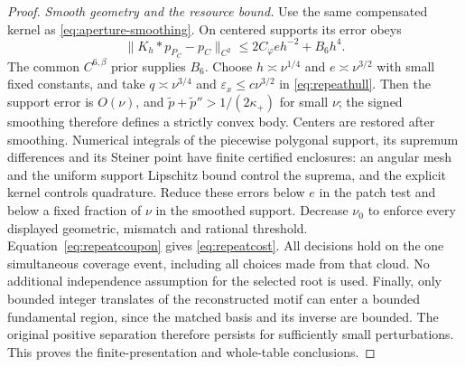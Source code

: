 \begin{proof}
\emph{Smooth geometry and the resource bound.}
Use the same compensated kernel as \eqref{eq:aperture-smoothing}.
On centered supports its error obeys
\[
 \|K_h*p_{P_C}-p_C\|_{C^2}
                 \le2C_\varphi e h^{-2}+B_6h^4.
\]
The common $C^{6,\beta}$ prior supplies $B_6$. Choose
$h\asymp\nu^{1/4}$ and $e\asymp\nu^{3/2}$ with small fixed constants,
and take $q\asymp\nu^{3/4}$ and
$\varepsilon_x\le c\nu^{3/2}$ in \eqref{eq:repeathull}.
Then the support error is $O(\nu)$, and
$\widetilde p+\widetilde p''>1/(2\kappa_+)$ for small $\nu$;
the signed smoothing therefore defines a strictly convex body.
Centers are restored after smoothing. Numerical integrals of the
piecewise polygonal support, its supremum differences and its Steiner
point have finite certified enclosures: an angular mesh and the uniform
support Lipschitz bound control the suprema, and the explicit kernel
controls quadrature. Reduce these errors below $e$ in the patch test and
below a fixed fraction of $\nu$ in the smoothed support.
Decrease $\nu_0$ to enforce every displayed geometric, mismatch and
rational threshold. Equation~\eqref{eq:repeatcoupon} gives
\eqref{eq:repeatcost}. All decisions hold on the one simultaneous
coverage event, including all choices made from that cloud. No
additional independence assumption for the selected root is used.
Finally, only bounded integer translates of the reconstructed motif
can enter a bounded fundamental region, since the matched basis and its
inverse are bounded. The original positive separation therefore persists
for sufficiently small perturbations. This proves the finite-presentation
and whole-table conclusions.
\end{proof}

